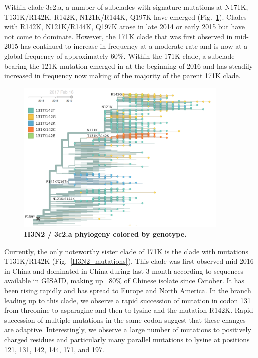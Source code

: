 \documentclass[11pt,oneside,letterpaper]{article}
\begin{document}
\pagebreak

Within clade 3c2.a, a number of subclades with signature mutations at N171K, T131K/R142K, R142K, N121K/R144K, Q197K have emerged (Fig.\ \ref{H3N2_tree}).
Clades with R142K, N121K/R144K, Q197K arose in late 2014 or early 2015 but have not come to dominate.
However, the 171K clade that was first observed in mid-2015 has continued to increase in frequency at a moderate rate and is now at a global frequency of approximately 60\%.
Within the 171K clade, a subclade bearing the 121K mutation emerged in at the beginning of 2016 and has steadily increased in frequency now making of the majority of the parent 171K clade.

\begin{figure}[H]
	\centering
	\includegraphics[width=0.9\textwidth]{../figures/feb-2017/h3n2_tree.png}
	\caption{\textbf{H3N2 / 3c2.a phylogeny colored by genotype.}
	}
	\label{H3N2_tree}
\end{figure}

Currently, the only noteworthy sister clade of 171K is the clade with mutations T131K/R142K (Fig.\ \ref{H3N2_mutations}).
This clade was first observed mid-2016 in China and dominated in China during last 3 month according to sequences available in GISAID, making up ~80\% of Chinese isolate since October.
It has been rising rapidly and has spread to Europe and North America.
In the branch leading up to this clade, we observe a rapid succession of mutation in codon 131 from threonine to asparagine and then to lysine and the mutation R142K.
Rapid succession of multiple mutations in the same codon suggest that these changes are adaptive.
Interestingly, we observe a large number of mutations to positively charged residues and particularly many parallel mutations to lysine at positions 121, 131, 142, 144, 171, and 197.
\end{document}
